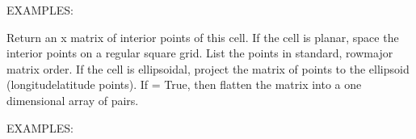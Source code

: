 \documentclass[a4paper,12ptopenany,oneside,english]{sphinxmanual}
\begin{document}
\begin{fulllineitems}
\begin{fulllineitems}
\sphinxAtStartPar
EXAMPLES:

\begin{sphinxVerbatim}[commandchars=\\\{\}]
  
   \PYG{p}{[} \PYG{p}{]}
\end{sphinxVerbatim}

\end{fulllineitems}


\begin{fulllineitems}
\label{\detokenize{dggs:rhealpixdggs.dggs.Cell.interior}}
\pysigstartsignatures
{}
\pysigstopsignatures
\sphinxAtStartPar
Return an  x  matrix of interior points of this cell.
If the cell is planar, space the interior points on a regular
square grid.
List the points in standard, row\sphinxhyphen{}major matrix order.
If the cell is ellipsoidal, project the matrix of points to the
ellipsoid (longitude\sphinxhyphen{}latitude points).
If  = True, then flatten the matrix into a one dimensional
array of pairs.

\sphinxAtStartPar
EXAMPLES:


\end{fulllineitems}
\end{fulllineitems}
\end{document}
